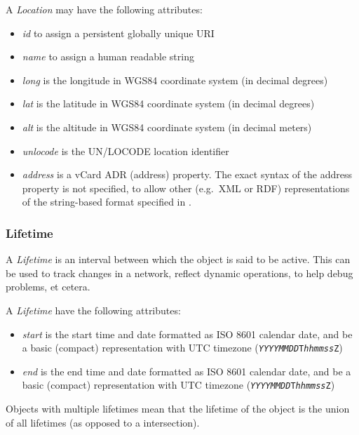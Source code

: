 A \emph{Location} may have the following attributes:
\begin{itemize}
    \item \emph{id} to assign a persistent globally unique URI
    \item \emph{name} to assign a human readable string
    \item \emph{long} is the longitude in WGS84 coordinate system (in decimal degrees)~\cite{wgs84}
    \item \emph{lat} is the latitude in WGS84 coordinate system (in decimal degrees)
    \item \emph{alt} is the altitude in WGS84 coordinate system (in decimal meters) 
    \item \emph{unlocode} is the UN/LOCODE location identifier~\cite{unlocode}
    \item \emph{address} is a vCard ADR (address) property. The exact syntax of the address property is not specified, to allow other (e.g.\ XML or RDF) representations of the string-based format specified in \cite{vcard}.
\end{itemize}



\subsubsection{Lifetime}%
\label{class:lifetime}

A \emph{Lifetime} is an interval between which the object is said to be active. This can be used to track changes in a network, reflect dynamic operations, to help debug problems, et cetera.

A \emph{Lifetime} \MAY{} have the following attributes:
\begin{itemize}
    \item \emph{start} is the start time and date formatted as ISO 8601 calendar date, and \SHOULD{} be a basic (compact) representation with UTC timezone (\texttt{\emph{YYYYMMDD}T\emph{hhmmss}Z})~\cite{iso8601}
    \item \emph{end} is the end time and date formatted as ISO 8601 calendar date, and \SHOULD{} be a basic (compact) representation with UTC timezone (\texttt{\emph{YYYYMMDD}T\emph{hhmmss}Z})
\end{itemize}

Objects with multiple lifetimes mean that the lifetime of the object is the union of all lifetimes (as opposed to a intersection).

